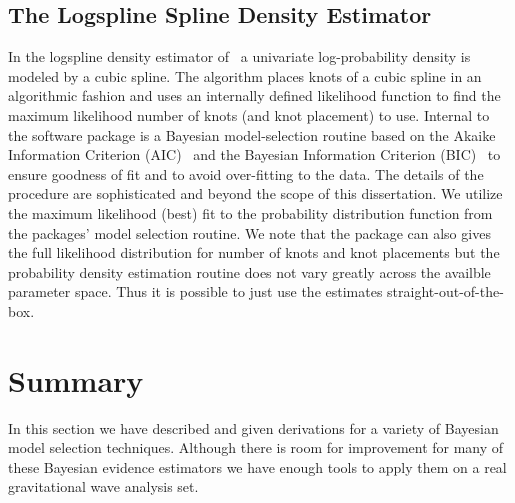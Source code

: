 \subsection{The Logspline Spline Density Estimator}
In the logspline density estimator of~\cite{stone1997polynomial} a univariate log-probability density is modeled by a cubic spline. The algorithm places knots of a cubic spline in an algorithmic fashion and uses an internally defined likelihood function to find the maximum likelihood number of knots (and knot placement) to use. Internal to the software package is a Bayesian model-selection routine based on the Akaike Information Criterion (AIC)~\citep{akaike1981likelihood} and the Bayesian Information Criterion (BIC)~\citep{schwarz1978estimating} to ensure goodness of fit and to avoid over-fitting to the data. The details of the procedure are sophisticated and beyond the scope of this dissertation. We utilize the maximum likelihood (best) fit to the probability distribution function from the packages' model selection routine. We note that the package can also gives the full likelihood distribution for number of knots and knot placements but the probability density estimation routine does not vary greatly across the availble parameter space. Thus it is possible to just use the estimates straight-out-of-the-box.

\section{Summary}
In this section we have described and given derivations for a variety of Bayesian model selection techniques. Although there is room for improvement for many of these Bayesian evidence estimators we have enough tools to apply them on a real gravitational wave analysis set.
